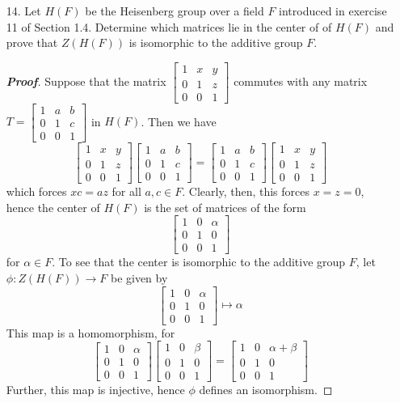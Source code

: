 \documentclass[12pt,leqno]{book}
\theoremstyle{definition}
\newenvironment{Proof}{\begin{proof}[\textnormal{\textbf{Proof}}]}{\end{proof}}
\begin{document}
\begin{enumerate}
\begin{Proof}
If $N_G(H)=G$ then, since $N_G(H)=C_G(H)$, we have $C_G(H)=G$, i.e., that all elements of $G$ commute with $H$. Thus $H\leq Z(G)$.
\end{Proof}
 \item [14.] Let $H(F)$ be the Heisenberg group over a field $F$ introduced in exercise 11 of Section 1.4. Determine which matrices lie in the center of of $H(F)$ and prove that $Z(H(F))$ is isomorphic to the additive group $F$.
\begin{Proof}
 Suppose that the matrix $\begin{bmatrix}1&x&y\\0&1&z\\0&0&1\end{bmatrix}$ commutes with any matrix $T=\begin{bmatrix}1&a&b\\0&1&c\\0&0&1\end{bmatrix}$ in $H(F)$. Then we have \[\begin{bmatrix}1&x&y\\0&1&z\\0&0&1\end{bmatrix}\begin{bmatrix}1&a&b\\0&1&c\\0&0&1\end{bmatrix}=\begin{bmatrix}1&a&b\\0&1&c\\0&0&1\end{bmatrix}\begin{bmatrix}1&x&y\\0&1&z\\0&0&1\end{bmatrix}\] which forces $xc=az$ for all $a,c\in F$. Clearly, then, this forces $x=z=0$, hence the center of $H(F)$ is the set of matrices of the form \[\begin{bmatrix}1&0&\alpha\\0&1&0\\0&0&1\end{bmatrix}\] for $\alpha\in F$. To see that the center is isomorphic to the additive group $F$, let $\phi:Z(H(F))\to F$ be given by \[\begin{bmatrix}1&0&\alpha\\0&1&0\\0&0&1\end{bmatrix}\mapsto\alpha\] This map is a homomorphism, for \[\begin{bmatrix}1&0&\alpha\\0&1&0\\0&0&1\end{bmatrix}\begin{bmatrix}1&0&\beta\\0&1&0\\0&0&1\end{bmatrix}=\begin{bmatrix}1&0&\alpha+\beta\\0&1&0\\0&0&1\end{bmatrix}\] Further, this map is injective, hence $\phi$ defines an isomorphism.

\end{Proof}
\end{enumerate}
\end{document}

